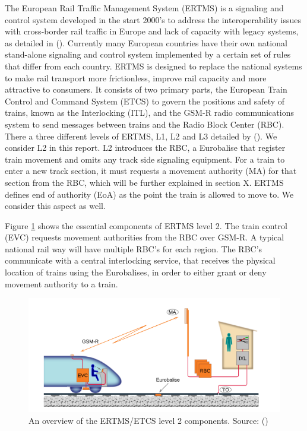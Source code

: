 \documentclass[preprint,12pt]{elsarticle}
\begin{document}
The European Rail Traffic Management System (ERTMS) is a signaling and control system developed in the start 2000's to address the interoperability issues with cross-border rail traffic in Europe and lack of capacity with legacy systems, as detailed in (\citet{Ghazel2014}). Currently many European countries have their own national stand-alone signaling and control system implemented by a certain set of rules that differ from each country. ERTMS is designed to replace the national systems to make rail transport more frictionless, improve rail capacity and more attractive to consumers. It consists of two primary parts, the European Train Control and Command System (ETCS) to govern the positions and safety of trains, known as the Interlocking (ITL), and the GSM-R radio communications system to send messages between trains and the Radio Block Center (RBC). There a three different levels of ERTMS, L1, L2 and L3 detailed by (\citet{Outlook2012}). We consider L2 in this report. L2 introduces the RBC, a Eurobalise that register train movement and omits any track side signaling equipment. For a train to enter a new track section, it must requests a movement authority (MA) for that section from the RBC, which will be further explained in section X. ERTMS defines end of authority (EoA) as the point the train is allowed to move to. We consider this aspect as well.

Figure \ref{fig:ertmsoverview} shows the essential components of ERTMS level 2. The train control (EVC) requests movement authorities from the RBC over GSM-R. A typical national rail way will have multiple RBC's for each region. The RBC's communicate with a central interlocking service, that receives the physical location of trains using the Eurobalises, in order to either grant or deny movement authority to a train.

\begin{figure}[h]
	\centering
	\includegraphics[width=0.8\linewidth]{ERTMS.png}
	\caption{An overview of the ERTMS/ETCS level 2 components. Source: (\citet{Berger2018})}
	\label{fig:ertmsoverview}
\end{figure}
\end{document}
